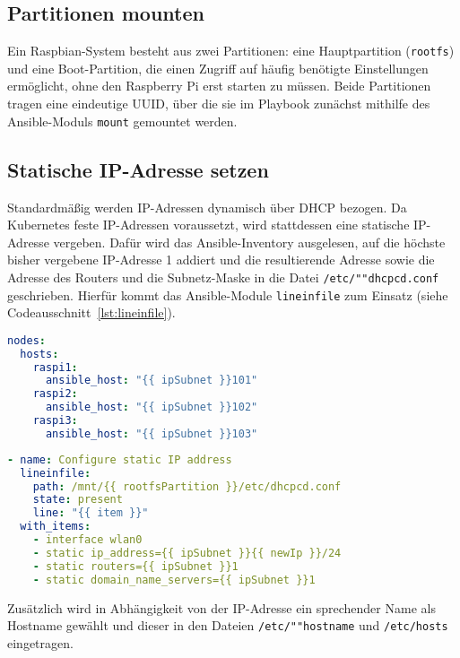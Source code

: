 \subsection{Partitionen mounten}\label{subsec:partitionen-mounten}

Ein Raspbian-System besteht aus zwei Partitionen: eine Hauptpartition (\texttt{rootfs}) und eine Boot-Partition, die einen Zugriff auf häufig benötigte Einstellungen ermöglicht, ohne den Raspberry Pi erst starten zu müssen.
Beide Partitionen tragen eine eindeutige UUID, über die sie im Playbook zunächst mithilfe des Ansible-Moduls \texttt{mount} gemountet werden.

\subsection{Statische IP-Adresse setzen}\label{subsec:statische-ip-adresse-setzen}

Standardmäßig werden IP-Adressen dynamisch über DHCP bezogen.
Da Kubernetes feste IP-Adressen voraussetzt, wird stattdessen eine statische IP-Adresse vergeben.
Dafür wird das Ansible-Inventory ausgelesen, auf die höchste bisher vergebene IP-Adresse 1 addiert und die resultierende Adresse sowie die Adresse des Routers und die Subnetz-Maske in die Datei \texttt{/etc/""dhcpcd.conf} geschrieben.
Hierfür kommt das Ansible-Module \texttt{lineinfile} zum Einsatz (siehe Codeausschnitt~\ref{lst:lineinfile}).

\begin{lstlisting}[language=yaml, caption=Ansible-Inventory mit drei Hosts]
nodes:
  hosts:
    raspi1:
      ansible_host: "{{ ipSubnet }}101"
    raspi2:
      ansible_host: "{{ ipSubnet }}102"
    raspi3:
      ansible_host: "{{ ipSubnet }}103"
\end{lstlisting}

\begin{lstlisting}[language=yaml, caption=Ansible-Task zur Einrichtung einer statischen IP-Adresse,label={lst:lineinfile}]
- name: Configure static IP address
  lineinfile:
    path: /mnt/{{ rootfsPartition }}/etc/dhcpcd.conf
    state: present
    line: "{{ item }}"
  with_items:
    - interface wlan0
    - static ip_address={{ ipSubnet }}{{ newIp }}/24
    - static routers={{ ipSubnet }}1
    - static domain_name_servers={{ ipSubnet }}1
\end{lstlisting}

Zusätzlich wird in Abhängigkeit von der IP-Adresse ein sprechender Name als Hostname gewählt und dieser in den Dateien \texttt{/etc/""hostname} und \texttt{/etc/hosts} eingetragen.

